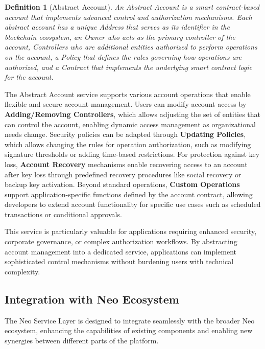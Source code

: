 \documentclass{article}
\newtheorem{definition}{Definition}
\begin{document}
\begin{definition}[Abstract Account]
An Abstract Account is a smart contract-based account that implements advanced control and authorization mechanisms. Each abstract account has a unique Address that serves as its identifier in the blockchain ecosystem, an Owner who acts as the primary controller of the account, Controllers who are additional entities authorized to perform operations on the account, a Policy that defines the rules governing how operations are authorized, and a Contract that implements the underlying smart contract logic for the account.
\end{definition}

The Abstract Account service supports various account operations that enable flexible and secure account management. Users can modify account access by \textbf{Adding/Removing Controllers}, which allows adjusting the set of entities that can control the account, enabling dynamic access management as organizational needs change. Security policies can be adapted through \textbf{Updating Policies}, which allows changing the rules for operation authorization, such as modifying signature thresholds or adding time-based restrictions. For protection against key loss, \textbf{Account Recovery} mechanisms enable recovering access to an account after key loss through predefined recovery procedures like social recovery or backup key activation. Beyond standard operations, \textbf{Custom Operations} support application-specific functions defined by the account contract, allowing developers to extend account functionality for specific use cases such as scheduled transactions or conditional approvals.

This service is particularly valuable for applications requiring enhanced security, corporate governance, or complex authorization workflows. By abstracting account management into a dedicated service, applications can implement sophisticated control mechanisms without burdening users with technical complexity.

\subsection{Integration with Neo Ecosystem}
\label{subsec:nsl-integration}

The Neo Service Layer is designed to integrate seamlessly with the broader Neo ecosystem, enhancing the capabilities of existing components and enabling new synergies between different parts of the platform.
\end{document}
